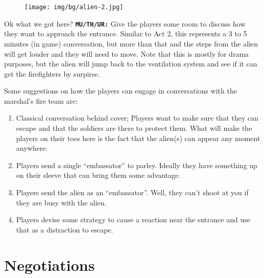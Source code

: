     
\newsect

\begin{figure}
    \centering
    \texttt{[image: img/bg/alien-2.jpg]}
\end{figure}

\clearpage


\begin{rpg-commentbox}{Ok what we got here?}
\texttt{\textbf{MU/TH/UR:}} Give the players some room to discuss how they want to approach the entrance. 
Similar to Act 2, this represents a 3 to 5 minutes (in game) conversation, but more than that and the steps from the alien will get louder and they will need to move. Note that this is mostly for drama purposes, but the alien will jump back to the ventilation system and see if it can get the firefighters by surpirse.

Some suggestions on how the players can engage in conversations with the marshal's fire team are:

\begin{enumerate}
    \item Classical conversation behind cover; Players want to make sure that they can escape and that the soldiers are there to protect them. What will make the players on their toes here is the fact that the alien(s) can appear any moment anywhere.
    \item Players send a single ``embassator'' to parley. Ideally they have something up on their sleeve that can bring them some advantage.
    \item Players send the alien as an ``embassator''. Well, they can't shoot at you if they are busy with the alien. 
    \item Players devise some strategy to cause a reaction near the entrance and use that as a distraction to escape.
\end{enumerate}

\end{rpg-commentbox}



\section{Negotiations}

